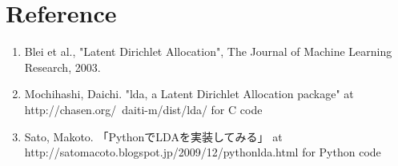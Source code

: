 \documentclass[a4paper,10.5pt,dvipdfmx]{jarticle}  %
\begin{document}
\section*{Reference}
\begin{enumerate}
	\item Blei et al., "Latent Dirichlet Allocation", The Journal of Machine Learning Research, 2003.
	\item Mochihashi, Daichi. "lda, a Latent Dirichlet Allocation package" at http://chasen.org/~daiti-m/dist/lda/ for C code
	\item Sato, Makoto. 「PythonでLDAを実装してみる」 at http://satomacoto.blogspot.jp/2009/12/pythonlda.html for Python code
\end{enumerate}
\end{document}
